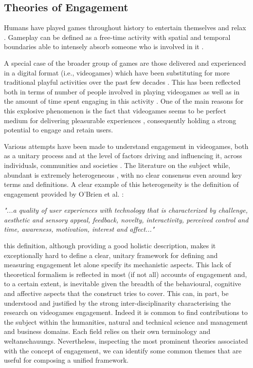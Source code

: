 \subsection{Theories of Engagement}
\label{factors_engagement}
Humans have played games throughout history to entertain themselves and relax \cite{connolly2012systematic}. Gameplay can be defined as a free-time activity with spatial and temporal boundaries able to intensely absorb someone who is involved in it \cite{connolly2012systematic}. 

A special case of the broader group of games are those delivered and experienced in a digital format (i.e., videogames) which  have been substituting for more traditional playful activities over the past few decades \cite{boyle2012engagement,connolly2012systematic}. This has been reflected both in terms of number of people involved in playing videogames as well as in the amount of time spent engaging in this activity \cite{boyle2012engagement, zendle2022transnational}. One of the main reasons for this explosive phenomenon is the fact that videogames seems to be perfect medium for delivering pleasurable experiences \cite{boyle2012engagement}, consequently holding a strong potential to engage and retain users. 

Various attempts have been made to understand engagement in videogames, both as a unitary process and at the level of factors driving and influencing it, across individuals, communities and societies \cite{boyle2012engagement}. The literature on the subject while, abundant is extremely heterogeneous \cite{boyle2012engagement}, with no clear consensus even around key terms and definitions. A clear example of this heterogeneity is the definition of engagement provided by O'Brien et al. \cite{o2008user}:

\textit{"...a quality of user experiences with technology that is characterized by challenge, aesthetic and sensory appeal, feedback, novelty, interactivity, perceived control and time, awareness, motivation, interest and affect..."}

this definition, although providing a good holistic description, makes it exceptionally hard to define a clear, unitary framework for defining and measuring engagement let alone specify its mechanistic aspects. This lack of theoretical formalism is reflected in most (if not all) accounts of engagement and, to a certain extent, is inevitable given the breadth of the behavioural, cognitive and affective aspects that the construct tries to cover. This can, in part, be understood and justified by the strong inter-disciplinarity characterising the research on videogames engagement. Indeed it is common to find contributions to the subject within the humanities, natural and technical science and management and business domains. Each field relies on their own terminology and weltanschauungs. Nevertheless, inspecting the most prominent theories associated with the concept of engagement, we can identify some common themes that are useful for composing a unified framework.

